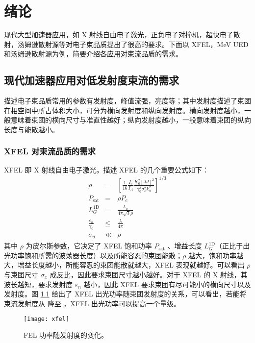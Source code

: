 \chapter{绪论}
\label{chap:intro}

现代大型加速器应用，如 X 射线自由电子激光，正负电子对撞机，超快电子散射，汤姆逊散射源等对电子束品质提出了很高的要求。下面以 XFEL，MeV UED 和汤姆逊散射源为例，简要介绍各应用对束流品质的需求。

\section{现代加速器应用对低发射度束流的需求}
描述电子束品质常用的参数有发射度，峰值流强，亮度等；其中发射度描述了束团在相空间中所占体积大小，可分为横向发射度和纵向发射度。横向发射度越小，一般意味着束团的横向尺寸与准直性越好；纵向发射度越小，一般意味着束团的纵向长度与能散越小。
\subsection{XFEL 对束流品质的需求}
XFEL 即 X 射线自由电子激光。描述 XFEL 的几个重要公式如下\cite{Huang:2007aa}：
\begin{eqnarray}
\rho &=& \left[\frac{1}{16}\frac{I_e}{I_A}\frac{K_0^2[JJ]^2}{\gamma_0^3\sigma_x^2k_u^2}\right]^{1/3}\\
P_{\text{sat}} &=& \rho P_e\\
L^{\text{1D}}_{G} &=& \frac{\lambda_u}{4\pi\sqrt{3}\rho}\\
\frac{\varepsilon_n}{\gamma_0} &\le& \frac{\lambda}{4\pi}\\
\sigma_{\eta} &\ll& \rho
\end{eqnarray}
其中 $\rho$ 为皮尔斯参数，它决定了 XFEL 饱和功率 $P_{\text{sat}}$ 、增益长度 $L^{\text{1D}}_{G}$（正比于出光功率饱和所需的波荡器长度）以及所能容忍的束团能散；$\rho$ 越大，饱和功率越大，增益长度越小，所能容忍的束团能散就越大，XFEL 表现就越好。可以看出 $\rho$ 与束团尺寸 $\sigma_x$ 成反比，因此要求束团尺寸越小越好。对于 XFEL 的 X 射线，其波长越短，要求发射度 $\varepsilon_n$ 越小，因此 XFEL 要求束团有尽可能小的横向尺寸以及发射度。图 \ref{fig:xfel} 给出了 XFEL 出光功率随束团发射度的关系，可以看出，若能将束流发射度从  降至 ，XFEL 出光功率可以提高一个量级。
\begin{figure}[htbp]
\centering
\texttt{[image: xfel]}
\caption{\label{fig:xfel} FEL 功率随发射度的变化\cite{prat2014emittance}。}
\end{figure}


